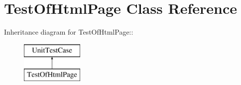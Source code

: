 \hypertarget{class_test_of_html_page}{
\section{TestOfHtmlPage Class Reference}
\label{class_test_of_html_page}
}
Inheritance diagram for TestOfHtmlPage::\begin{figure}[H]
\begin{center}
\leavevmode
\includegraphics[height=2cm]{class_test_of_html_page}
\end{center}
\end{figure}
